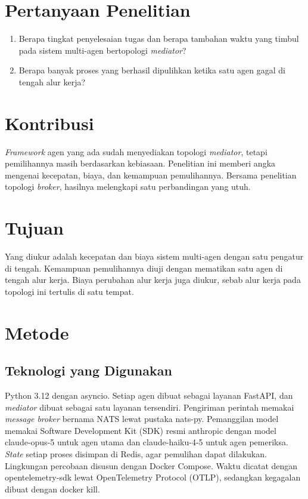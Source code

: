 \documentclass[11pt,a4paper]{article}
\begin{document}
\section{Pertanyaan Penelitian}

\begin{enumerate}[label=\textbf{Pertanyaan \arabic*.}, leftmargin=*, labelsep=0.5em]
  \item Berapa tingkat penyelesaian tugas dan berapa tambahan waktu yang timbul pada sistem multi-agen bertopologi \textit{mediator}?
  \item Berapa banyak proses yang berhasil dipulihkan ketika satu agen gagal di tengah alur kerja?
\end{enumerate}

\section{Kontribusi}

\textit{Framework} agen yang ada sudah menyediakan topologi \textit{mediator}, tetapi pemilihannya masih berdasarkan kebiasaan. Penelitian ini memberi angka mengenai kecepatan, biaya, dan kemampuan pemulihannya. Bersama penelitian topologi \textit{broker}, hasilnya melengkapi satu perbandingan yang utuh.

\section{Tujuan}

Yang diukur adalah kecepatan dan biaya sistem multi-agen dengan satu pengatur di tengah. Kemampuan pemulihannya diuji dengan mematikan satu agen di tengah alur kerja. Biaya perubahan alur kerja juga diukur, sebab alur kerja pada topologi ini tertulis di satu tempat.

\section{Metode}

\subsection{Teknologi yang Digunakan}

Python 3.12 dengan asyncio. Setiap agen dibuat sebagai layanan FastAPI, dan \textit{mediator} dibuat sebagai satu layanan tersendiri. Pengiriman perintah memakai \textit{message broker} bernama NATS lewat pustaka nats-py. Pemanggilan model memakai Software Development Kit (SDK) resmi anthropic dengan model claude-opus-5 untuk agen utama dan claude-haiku-4-5 untuk agen pemeriksa. \textit{State} setiap proses disimpan di Redis, agar pemulihan dapat dilakukan. Lingkungan percobaan disusun dengan Docker Compose. Waktu dicatat dengan opentelemetry-sdk lewat OpenTelemetry Protocol (OTLP), sedangkan kegagalan dibuat dengan docker kill.
\end{document}
